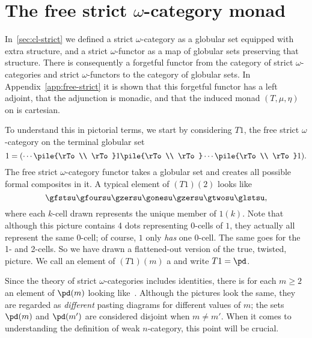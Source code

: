 \section{The free strict $\omega$-category monad}


In~\ref{sec:cl-strict} we defined a strict $\omega$-category as a globular
set equipped with extra structure, and a strict $\omega$-functor as a map
of globular sets preserving that structure.  There is consequently a
forgetful functor from the category \strcat{\omega} of strict
$\omega$-categories and strict $\omega$-functors to the category
 of globular sets.  In
Appendix~\ref{app:free-strict} it is shown that this forgetful functor has
a left adjoint, that the adjunction is monadic, and that the induced monad
$(T, \mu, \eta)$%
% 
%
%
%
% 
on  is cartesian.  

To understand this in pictorial terms, we start by considering $T1$, the
free strict $\omega$-category on the terminal globular set
\[
1 = (\cdots \pile{\rTo \\ \rTo} 1 \pile{\rTo \\ \rTo} \cdots
\pile{\rTo \\ \rTo} 1).	\\
\] 
The free strict $\omega$-category functor takes a globular set and creates
all possible formal composites in it.  A typical element of $(T1)(2)$ looks
like
%
\begin{equation}	\label{eq:typical-glob-pd}
\gfstsu
\gfoursu
\gzersu
\gonesu
\gzersu
\gtwosu
\glstsu,
\end{equation}
% 
where each $k$-cell drawn represents the unique member of $1(k)$.  Note
that although this picture contains 4 dots representing 0-cells of $1$,
they actually all represent the same 0-cell; of course, $1$ only \emph{has}
one 0-cell.  The same goes for the 1- and 2-cells.  So we have drawn a
flattened-out version of the true, twisted, picture.  We call an element of
$(T1)(m)$ a  and write $T1=\pd$.%
% 
% 

Since the theory of strict $\omega$-categories includes identities, there
is for each $m\geq 2$ an element of $\pd(m)$ looking
like~.  Although the pictures look the same, they
are regarded as \emph{different}%
%
%
%
%
%
pasting diagrams for different values of $m$; the sets $\pd(m)$ and
$\pd(m')$ are considered disjoint when $m \neq m'$.  When it comes to
understanding the definition of weak $n$-category, this point will be
crucial.  

